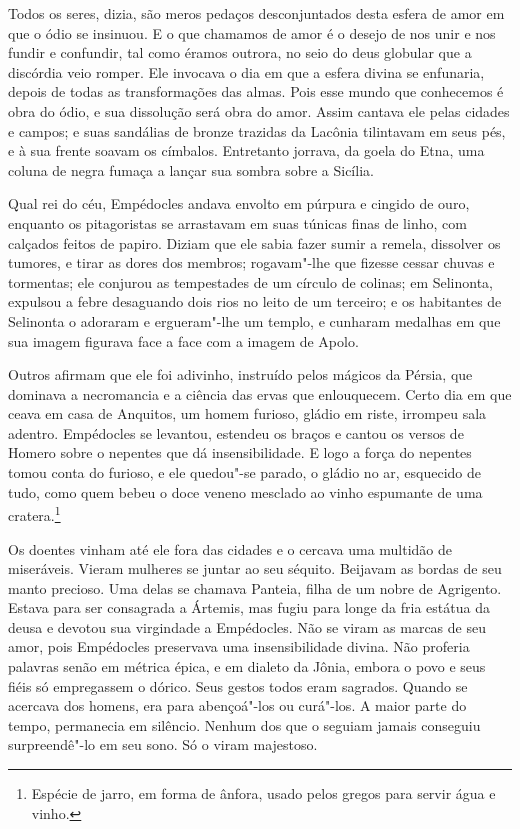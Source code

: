 Todos os seres, dizia, são meros pedaços desconjuntados desta esfera de
amor em que o ódio se insinuou. E o que chamamos de amor é o desejo de nos
unir e nos fundir e confundir, tal como éramos outrora, no seio do deus
globular que a discórdia veio romper. Ele invocava o dia em que a esfera
divina se enfunaria, depois de todas as transformações das almas. Pois
esse mundo que conhecemos é obra do ódio, e sua dissolução será obra do
amor. Assim cantava ele pelas cidades e campos; e suas sandálias de bronze
trazidas da Lacônia tilintavam em seus pés, e à sua frente soavam os
címbalos. Entretanto jorrava, da goela do Etna, uma coluna de negra fumaça
a lançar sua sombra sobre a Sicília.

Qual rei do céu, Empédocles andava envolto em púrpura e cingido de ouro,
enquanto os pitagoristas se arrastavam em suas túnicas finas de linho, com
calçados feitos de papiro. Diziam que ele sabia fazer sumir a remela,
dissolver os tumores, e tirar as dores dos membros; rogavam"-lhe que
fizesse cessar chuvas e tormentas; ele conjurou as tempestades de um
círculo de colinas; em Selinonta, expulsou a febre desaguando dois rios no
leito de um terceiro; e os habitantes de Selinonta o adoraram e
ergueram"-lhe um templo, e cunharam medalhas em que sua imagem figurava
face a face com a imagem de Apolo.

Outros afirmam que ele foi adivinho, instruído pelos mágicos da Pérsia, que
dominava a necromancia e a ciência das ervas que enlouquecem. Certo dia em
que ceava em casa de Anquitos, um homem furioso, gládio em riste, irrompeu
sala adentro. Empédocles se levantou, estendeu os braços e cantou os
versos de Homero sobre o nepentes que dá insensibilidade. E logo a força
do nepentes tomou conta do furioso, e ele quedou"-se parado, o gládio no
ar, esquecido de tudo, como quem bebeu o doce veneno mesclado ao vinho
espumante de uma cratera.\footnote{ Espécie de jarro, em forma de ânfora, usado pelos gregos para servir água e vinho.}

Os doentes vinham até ele fora das cidades e o cercava uma multidão de
miseráveis. Vieram mulheres se juntar ao seu séquito. Beijavam as bordas
de seu manto precioso. Uma delas se chamava Panteia, filha de um nobre de
Agrigento. Estava para ser consagrada a Ártemis, mas fugiu para longe da
fria estátua da deusa e devotou sua virgindade a Empédocles. Não se viram
as marcas de seu amor, pois Empédocles preservava uma insensibilidade
divina. Não proferia palavras senão em métrica épica, e em dialeto da
Jônia, embora o povo e seus fiéis só empregassem o dórico. Seus gestos
todos eram sagrados. Quando se acercava dos homens, era para abençoá"-los
ou curá"-los. A maior parte do tempo, permanecia em silêncio. Nenhum dos
que o seguiam jamais conseguiu surpreendê"-lo em seu sono. Só o viram
majestoso.

